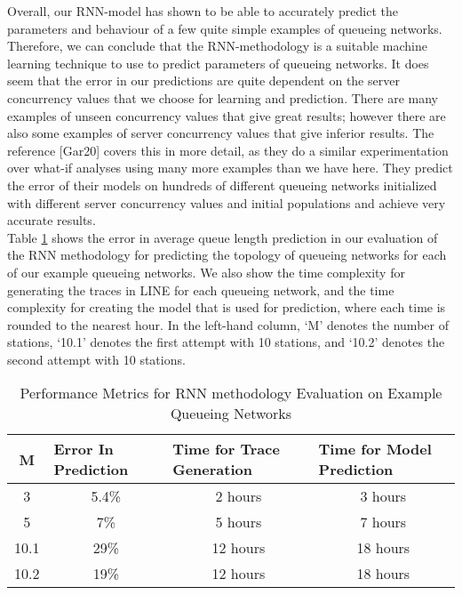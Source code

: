 \documentclass[a4paper,11pt,titlepage]{article}
\begin{document}
Overall, our RNN-model has shown to be able to accurately predict the parameters and behaviour of a few quite simple examples of queueing networks. Therefore, we can conclude that the RNN-methodology is a suitable machine learning technique to use to predict parameters of queueing networks. It does seem that the error in our predictions are quite dependent on the server concurrency values that we choose for learning and prediction. There are many examples of unseen concurrency values that give great results; however there are also some examples of server concurrency values that give inferior results. The reference [Gar20] covers this in more detail, as they do a similar experimentation over what-if analyses using many more examples than we have here. They predict the error of their models on hundreds of different queueing networks initialized with different server concurrency values and initial populations and achieve very accurate results. \\

Table \ref{tab:eval_rnn} shows the error in average queue length prediction in our evaluation of the RNN methodology for predicting the topology of queueing networks for each of our example queueing networks. We also show the time complexity for generating the traces in LINE for each queueing network, and the time complexity for creating the model that is used for prediction, where each time is rounded to the nearest hour. In the left-hand column, `M' denotes the number of stations, `10.1' denotes the first attempt with 10 stations, and `10.2' denotes the second attempt with 10 stations. 

\begin{table}[]
\begin{tabular}{|c|c|c|c|}
\hline
M & \multicolumn{1}{l|}{Error In Prediction} & \multicolumn{1}{l|}{Time for Trace Generation} & \multicolumn{1}{l|}{Time for Model Prediction} \\ \hline
3 & 5.4\% & 2 hours & 3 hours \\ \hline
5 & 7\% & 5 hours & 7 hours \\ \hline
10.1 & 29\% & 12 hours & 18 hours \\ \hline
\multicolumn{1}{|l|}{10.2} & 19\% & 12 hours & 18 hours \\ \hline
\end{tabular}
\caption{Performance Metrics for RNN methodology Evaluation on Example Queueing Networks}
\label{tab:eval_rnn}
\end{table}
\end{document}
